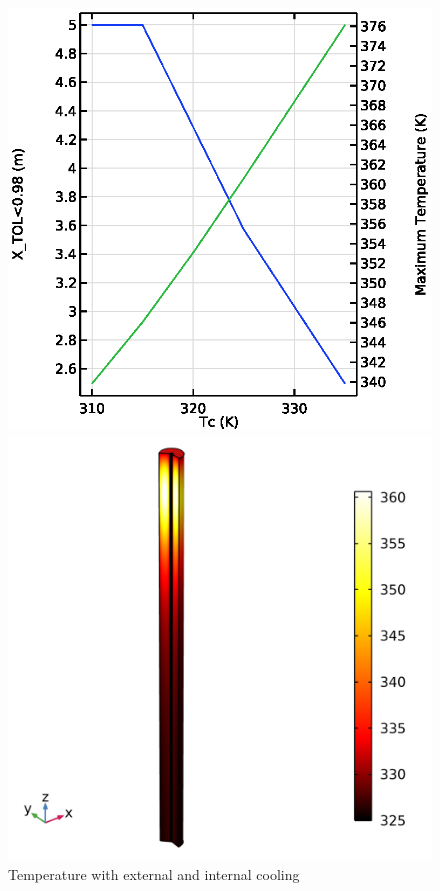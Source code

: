 \begin{figure}[h]
    \begin{minipage}[t]{0.45\linewidth}
        \includegraphics[width=\linewidth]{figures/S4-CW-X-T.eps}
        \caption{Effect of CW temperature on distance required to reach \SI{98}{\percent} conversion (blue) and max T (green). Maximum reactor length is capped at \SI{5}{\m} to prevent an excessively long reactor.}
        \label{fig:comsol-S4-CW-X-T}
    \end{minipage}\hfill
    \begin{minipage}[t]{0.45\linewidth}
        \includegraphics[width=\linewidth]{figures/temperature-surface.png}
        \caption{Temperature with external and internal cooling}
        \label{fig:comsol-temperature:surface}
    \end{minipage}
\end{figure}

